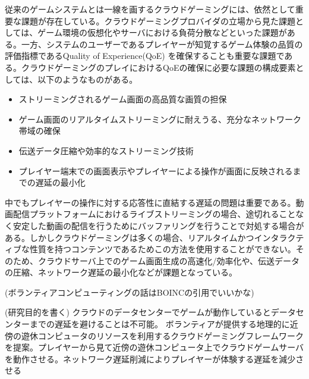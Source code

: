 従来のゲームシステムとは一線を画するクラウドゲーミングには、依然として重要な課題が存在している\cite{cloudgaming-survey}。クラウドゲーミングプロバイダの立場から見た課題としては、ゲーム環境の仮想化やサーバにおける負荷分散などといった課題がある。一方、システムのユーザーであるプレイヤーが知覚するゲーム体験の品質の評価指標であるQuality of Experience(QoE)
を確保することも重要な課題である。クラウドゲーミングのプレイにおけるQoEの確保に必要な課題の構成要素としては、以下のようなものがある。
\begin{itemize}
    \item ストリーミングされるゲーム画面の高品質な画質の担保
    \item ゲーム画面のリアルタイムストリーミングに耐えうる、充分なネットワーク帯域の確保
    \item 伝送データ圧縮や効率的なストリーミング技術
    \item プレイヤー端末での画面表示やプレイヤーによる操作が画面に反映されるまでの遅延の最小化
\end{itemize}
中でもプレイヤーの操作に対する応答性に直結する遅延の問題は重要である。動画配信プラットフォームにおけるライブストリーミングの場合、途切れることなく安定した動画の配信を行うためにバッファリングを行うことで対処する場合がある。しかしクラウドゲーミングは多くの場合、リアルタイムかつインタラクティブな性質を持つコンテンツであるためこの方法を使用することができない。そのため、クラウドサーバ上でのゲーム画面生成の高速化/効率化や、伝送データの圧縮、ネットワーク遅延の最小化などが課題となっている。

(ボランティアコンピューティングの話はBOINCの引用でいいかな)

(研究目的を書く)
クラウドのデータセンターでゲームが動作しているとデータセンターまでの遅延を避けることは不可能。
ボランティアが提供する地理的に近傍の遊休コンピュータのリソースを利用するクラウドゲーミングフレームワークを提案。プレイヤーから見て近傍の遊休コンピュータ上でクラウドゲームサーバを動作させる。ネットワーク遅延削減によりプレイヤーが体験する遅延を減少させる





 
